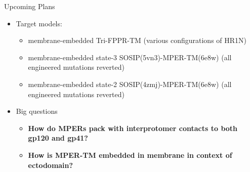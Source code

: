 \begin{frame}[fragile]{Upcoming Plans}
    \begin{itemize}
        \item Target models:
        \begin{itemize}
            \item membrane-embedded Tri-FPPR-TM (various configurations of HR1N)
            \item membrane-embedded state-3 SOSIP(5vn3)-MPER-TM(6e8w) (all engineered mutations reverted)
            \item membrane-embedded state-2 SOSIP(4zmj)-MPER-TM(6e8w) (all engineered mutations reverted)
        \end{itemize}
        \item Big questions
        \begin{itemize}
            \item {\bf How do MPERs pack with interprotomer contacts to both gp120 and gp41?}
            \item {\bf How is MPER-TM embedded in membrane in context of ectodomain?}
        \end{itemize}
    \end{itemize}
\end{frame}

